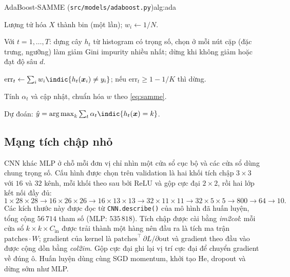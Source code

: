 \begin{algo}{AdaBoost-SAMME (\texttt{src/models/adaboost.py})}{alg:ada}
\item Lượng tử hóa $X$ thành bin (một lần); $w_i\leftarrow1/N$.
\item Với $t=1,\dots,T$: dựng cây $h_t$ từ histogram có trọng số, chọn ở mỗi nút cặp (đặc trưng, ngưỡng) làm giảm Gini impurity nhiều nhất; dừng khi không giảm hoặc đạt độ sâu $d$.
\item $\mathrm{err}_t\leftarrow\sum_i w_i\indic{h_t(\bm x_i)\ne y_i}$; nếu $\mathrm{err}_t\ge1-1/K$ thì dừng.
\item Tính $\alpha_t$ và cập nhật, chuẩn hóa $w$ theo \cref{eq:samme}.
\item Dự đoán: $\hat y=\argmax_k\sum_t\alpha_t\indic{h_t(\bm x)=k}$.
\end{algo}

\subsection{Mạng tích chập nhỏ}
\label{sec:cnn-method}
CNN \citep{lecun1998} khác MLP ở chỗ mỗi đơn vị chỉ nhìn một cửa sổ cục bộ và các cửa sổ dùng chung trọng số. Cấu hình được chọn trên validation là hai khối tích chập $3\times3$ với $16$ và $32$ kênh, mỗi khối theo sau bởi ReLU và gộp cực đại $2\times2$, rồi hai lớp kết nối đầy đủ:
\begin{equation*}
1{\times}28{\times}28\to16{\times}26{\times}26\to16{\times}13{\times}13\to32{\times}11{\times}11\to32{\times}5{\times}5\to800\to64\to10 .
\end{equation*}
Các kích thước này được đọc từ \texttt{CNN.describe()} của mô hình đã huấn luyện, tổng cộng $56\,714$ tham số (MLP: $535\,818$). Tích chập được cài bằng \emph{im2col}: mỗi cửa sổ $k\times k\times C_{\text{in}}$ được trải thành một hàng nên đầu ra là tích ma trận $\text{patches}\cdot W$; gradient của kernel là $\text{patches}^{\top}\,\partial L/\partial\text{out}$ và gradient theo đầu vào được cộng dồn bằng \emph{col2im}. Gộp cực đại ghi lại vị trí cực đại để chuyển gradient về đúng ô. Huấn luyện dùng cùng SGD momentum, khởi tạo He, dropout và dừng sớm như MLP.

